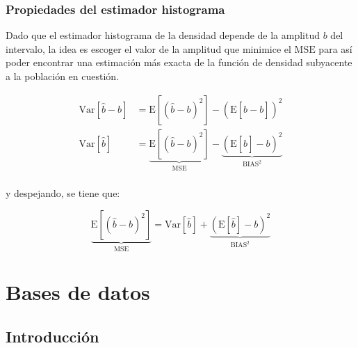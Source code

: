 \documentclass[
  letterpaper,
  DIV=11,
  numbers=noendperiod]{scrreprt}
\begin{document}
\hypertarget{propiedades-del-estimador-histograma}{%
\section{Propiedades del estimador
histograma}\label{propiedades-del-estimador-histograma}}

Dado que el estimador histograma de la densidad depende de la amplitud
\(b\) del intervalo, la idea es escoger el valor de la amplitud que
minimice el \(\textrm{MSE}\) para así poder encontrar una estimación más
exacta de la función de densidad subyacente a la población en cuestión.

\begin{align}
\textrm{Var}\left[\hat b - b\right] &= \textrm{E}\left[\left(\hat b - b\right)^2\right] - \left(\textrm{E}\left[\hat b - b\right]\right)^2\\
\textrm{Var}\left[\hat b\right] &= \underbrace{\textrm{E}\left[\left(\hat b - b\right)^2\right]}_{\textrm{MSE}} - \underbrace{\left(\textrm{E}\left[\hat b\right]-b\right)^2}_{\textrm{BIAS}^2}\\
\end{align}

y despejando, se tiene que:

\[\underbrace{\textrm{E}\left[\left(\hat b - b\right)^2\right]}_{\textrm{MSE}} = \textrm{Var}\left[\hat b\right] + \underbrace{\left(\textrm{E}\left[\hat b\right]-b\right)^2}_{\textrm{BIAS}^2}\]

\part{Bases de datos}

\hypertarget{introducciuxf3n-1}{%
\chapter{Introducción}\label{introducciuxf3n-1}}
\end{document}
